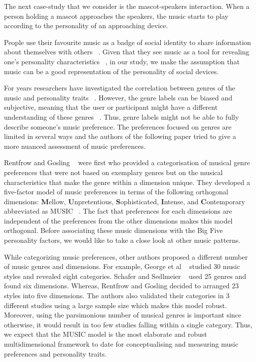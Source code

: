 The next case-study that we consider is the mascot-speakers interaction.
When a person holding a mascot approaches the speakers,
the music starts to play according to the personality of an approaching device.

People use their favourite music as a badge of social identity to share
information about themselves with others ~\cite{boer2011shared,rentfrow2007content}.
Given that they see music as a tool for revealing one’s personality characteristics ~\cite{rentfrow2006message},
in our study, we make the assumption that music can be a good representation of the personality of social devices.

For years researchers have investigated the correlation between genres of the music and personality
traits ~\cite{schafer2009functions,george2007association,zweigenhaft2008re,dunn2012toward}.
However, the genre labels can be biased and subjective, meaning that the user or
participant might have a different understanding of these genres ~\cite{rentfrow2011structure}.
Thus, genre labels might not be able to fully describe someone’s music preference.
The preferences focused on genres are limited in several ways and the authors of the
following paper tried to give a more nuanced assessment of music preferences.

Rentfrow and Gosling ~\cite{rentfrow2003re} were first who provided a categorisation
of musical genre preferences that were not based on exemplary genres but on the musical
characteristics that make the genre within a dimension unique.
They developed a five-factor model of music preferences in terms of the
following orthogonal dimensions: \textbf{M}ellow, \textbf{U}npretentious, \textbf{S}ophisticated,
\textbf{I}ntense, and \textbf{C}ontemporary abbreviated as MUSIC ~\cite{rentfrow2011structure}.
The fact that preferences for each dimensions are independent of the preferences
from the other dimensions makes this model orthogonal.
Before associating these music dimensions with the Big Five personality factors,
we would like to take a close look at other music patterns.

While categorizing music preferences, other authors proposed a different number of music genres and dimensions.
For example, George et al ~\cite{george2007association} studied 30 music styles and revealed eight categories.
Schafer and Sedlmeier ~\cite{schafer2009functions} used 25 genres and found six dimensions.
Whereas, Rentfrow and Gosling decided to arranged 23 styles into five dimensions.
The authors also validated their categories in 3 different studies
using a large sample size which makes this model robust.
Moreover, using the parsimonious number of musical genres is important since otherwise,
it would result in too few studies falling within a single category.
Thus, we expect that the MUSIC model is the most elaborate and robust
multidimensional framework to date for conceptualising and measuring music preferences and personality traits.

